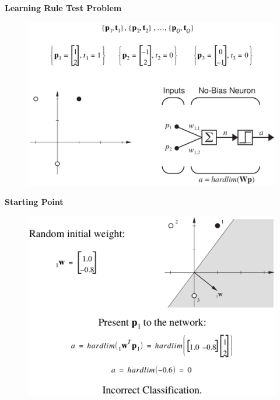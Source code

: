 \documentclass[10pt, compress]{beamer}
\begin{document}
\begin{frame}
  \vspace{1cm}
  \textbf{Learning Rule Test Problem}
  \begin{figure}
    \includegraphics[width=.9\linewidth]{imgs/perceptron_ex_1}
  \end{figure}
\end{frame}

\begin{frame}
  \vspace{1cm}
  \textbf{Starting Point}
  \begin{figure}
    \includegraphics[width=.9\linewidth]{imgs/perceptron_ex_2}
  \end{figure}
\end{frame}
\end{document}
